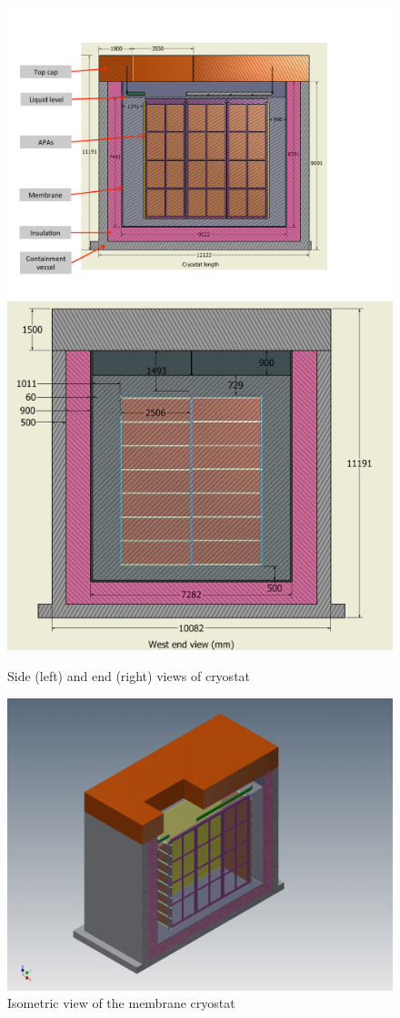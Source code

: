 \begin{figure}
\begin{center}
\includegraphics[width=.53\textwidth]{figures/cryostat-side-view} %
\includegraphics[width=.42\textwidth]{figures/cryostat-westend-view}  %
\caption[Views of cryostat]{\label{fig:cryostat-views} Side (left) and end (right) views of cryostat}
\end{center}
\end{figure}

\begin{figure}
\begin{center}
\includegraphics[width=.75\textwidth]{figures/cryostat-isometric-view} %
\caption[Isometric view of cryostat]{\label{fig:cryostat-views} Isometric view of the membrane cryostat}
\end{center}
\end{figure}

